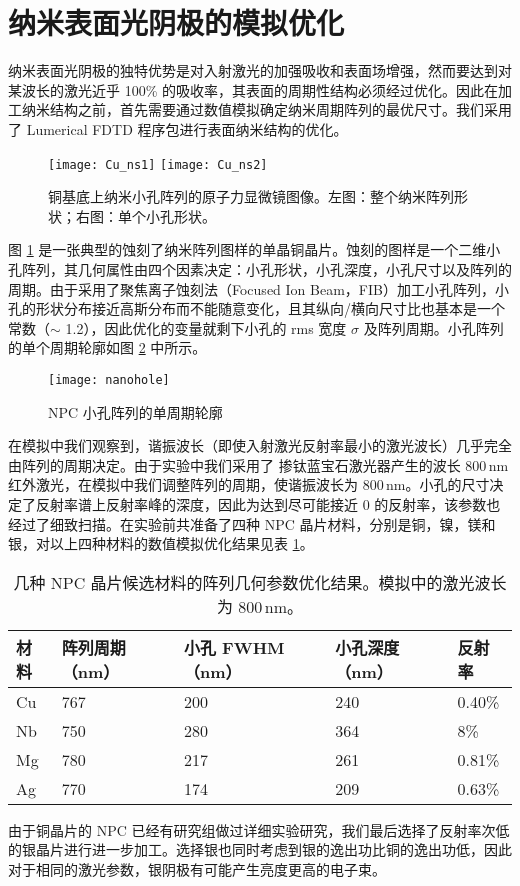 \section{纳米表面光阴极的模拟优化\label{sec:sim}}
纳米表面光阴极的独特优势是对入射激光的加强吸收和表面场增强，然而要达到对某波长的激光近乎 100\% 的吸收率，其表面的周期性结构必须经过优化。因此在加工纳米结构之前，首先需要通过数值模拟确定纳米周期阵列的最优尺寸。我们采用了 Lumerical FDTD 程序包进行表面纳米结构的优化。

\begin{figure}[htbp]
\centering
\texttt{[image: Cu\_ns1]}
\texttt{[image: Cu\_ns2]}
\caption{\label{fig:Cu_ns_sem} 
铜基底上纳米小孔阵列的原子力显微镜图像。左图：整个纳米阵列形状；右图：单个小孔形状。}
\end{figure}
图 \ref{fig:Cu_ns_sem} 是一张典型的蚀刻了纳米阵列图样的单晶铜晶片。蚀刻的图样是一个二维小孔阵列，其几何属性由四个因素决定：小孔形状，小孔深度，小孔尺寸以及阵列的周期。由于采用了聚焦离子蚀刻法（Focused Ion Beam，FIB）加工小孔阵列，小孔的形状分布接近高斯分布而不能随意变化，且其纵向/横向尺寸比也基本是一个常数（$\sim$ 1.2），因此优化的变量就剩下小孔的 rms 宽度 $\sigma$ 及阵列周期。小孔阵列的单个周期轮廓如图 \ref{fig:profile} 中所示。

\begin{figure}[htbp]
\begin{center}
\texttt{[image: nanohole]}
\caption{\label{fig:profile} NPC 小孔阵列的单周期轮廓}
\end{center}
\end{figure}

在模拟中我们观察到，谐振波长（即使入射激光反射率最小的激光波长）几乎完全由阵列的周期决定。由于实验中我们采用了 掺钛蓝宝石激光器产生的波长 800\,nm 红外激光，在模拟中我们调整阵列的周期，使谐振波长为 800\,nm。小孔的尺寸决定了反射率谱上反射率峰的深度，因此为达到尽可能接近 0 的反射率，该参数也经过了细致扫描。在实验前共准备了四种 NPC 晶片材料，分别是铜，镍，镁和银，对以上四种材料的数值模拟优化结果见表 \ref{tab:opt}。

\begin{table}[htbp]
\caption{\label{tab:opt}几种 NPC 晶片候选材料的阵列几何参数优化结果。模拟中的激光波长为 800\,nm。}
\begin{center}
\begin{tabular}{lllll}
\toprule
材料 & 阵列周期（nm）& 小孔 FWHM（nm）& 小孔深度（nm）& 反射率 \\
\midrule
Cu & 767 & 200 & 240 & 0.40\% \\
Nb & 750 & 280 & 364 & 8\% \\
Mg & 780 & 217 & 261 & 0.81\% \\
Ag & 770 & 174 & 209 & 0.63\% \\
\bottomrule
\end{tabular}
\end{center}
\end{table}
由于铜晶片的 NPC 已经有研究组做过详细实验研究，我们最后选择了反射率次低的银晶片进行进一步加工。选择银也同时考虑到银的逸出功比铜的逸出功低，因此对于相同的激光参数，银阴极有可能产生亮度更高的电子束。

